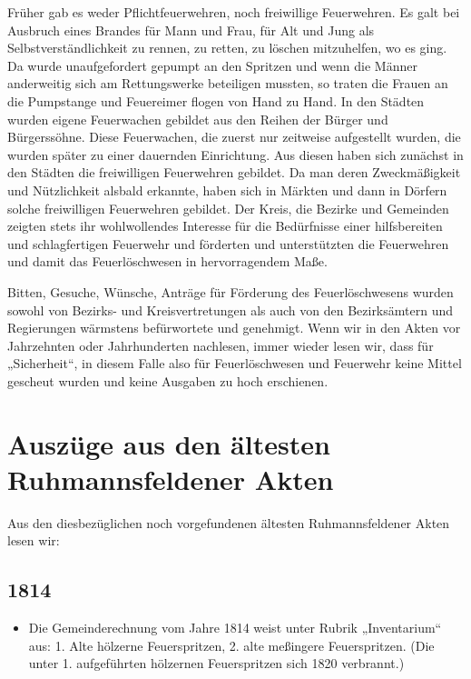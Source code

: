 \documentclass[12pt,a4paper]{book}
\begin{document}
Früher gab es weder Pflichtfeuerwehren, noch freiwillige Feuerwehren. Es galt
bei Ausbruch eines Brandes für Mann und Frau, für Alt und Jung als
Selbstverständlichkeit zu rennen, zu retten, zu löschen mitzuhelfen, wo es ging.
Da wurde unaufgefordert gepumpt an den Spritzen und wenn die Männer anderweitig
sich am Rettungswerke beteiligen mussten, so traten die Frauen an die Pumpstange
und Feuereimer flogen von Hand zu Hand. In den Städten wurden eigene Feuerwachen
gebildet aus den Reihen der Bürger und Bürgerssöhne. Diese Feuerwachen, die
zuerst nur zeitweise aufgestellt wurden, die wurden später zu einer dauernden
Einrichtung. Aus diesen haben sich zunächst in den Städten die freiwilligen
Feuerwehren gebildet. Da man deren Zweckmäßigkeit und Nützlichkeit alsbald
erkannte, haben sich in Märkten und dann in Dörfern solche freiwilligen
Feuerwehren gebildet. Der Kreis, die Bezirke und Gemeinden zeigten stets ihr
wohlwollendes Interesse für die Bedürfnisse einer hilfsbereiten und
schlagfertigen Feuerwehr und förderten und unterstützten die Feuerwehren und
damit das Feuerlöschwesen in hervorragendem Maße.

Bitten, Gesuche, Wünsche, Anträge für Förderung des Feuerlöschwesens wurden
sowohl von Bezirks- und Kreisvertretungen als auch von den Bezirksämtern und
Regierungen wärmstens befürwortete und genehmigt. Wenn wir in den Akten vor
Jahrzehnten oder Jahrhunderten nachlesen, immer wieder lesen wir, dass für
„Sicherheit“, in diesem Falle also für Feuerlöschwesen und Feuerwehr keine
Mittel gescheut wurden und keine Ausgaben zu hoch erschienen.

\chapter{Auszüge aus den ältesten Ruhmannsfeldener Akten}

Aus den diesbezüglichen noch vorgefundenen ältesten Ruhmannsfeldener Akten lesen
wir:

\section*{1814}

\begin{itemize}
\item Die Gemeinderechnung vom Jahre 1814 weist unter Rubrik „Inventarium“ aus:
1. Alte hölzerne Feuerspritzen, 2. alte meßingere Feuerspritzen. (Die unter 1.
aufgeführten hölzernen Feuerspritzen sich 1820 verbrannt.)
\end{itemize}
\end{document}
